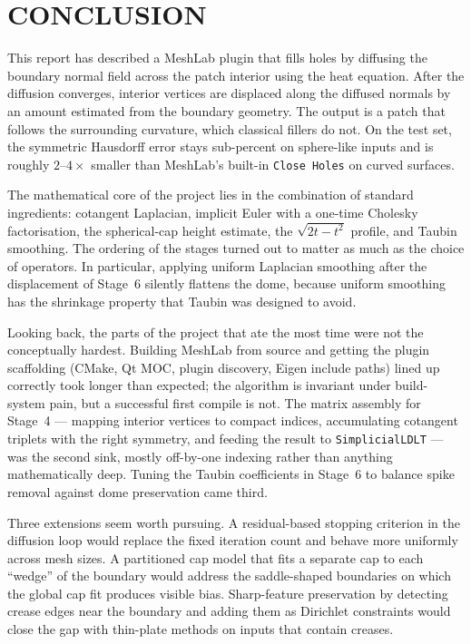 \chapter{CONCLUSION}

This report has described a MeshLab plugin that fills holes by diffusing the boundary normal field across the patch interior using the heat equation. After the diffusion converges, interior vertices are displaced along the diffused normals by an amount estimated from the boundary geometry. The output is a patch that follows the surrounding curvature, which classical fillers do not. On the test set, the symmetric Hausdorff error stays sub-percent on sphere-like inputs and is roughly $2$--$4\times$ smaller than MeshLab's built-in \texttt{Close Holes} on curved surfaces.

The mathematical core of the project lies in the combination of standard ingredients: cotangent Laplacian, implicit Euler with a one-time Cholesky factorisation, the spherical-cap height estimate, the $\sqrt{2t-t^2}$ profile, and Taubin smoothing. The ordering of the stages turned out to matter as much as the choice of operators. In particular, applying uniform Laplacian smoothing after the displacement of Stage~6 silently flattens the dome, because uniform smoothing has the shrinkage property that Taubin was designed to avoid.

Looking back, the parts of the project that ate the most time were not the conceptually hardest. Building MeshLab from source and getting the plugin scaffolding (CMake, Qt MOC, plugin discovery, Eigen include paths) lined up correctly took longer than expected; the algorithm is invariant under build-system pain, but a successful first compile is not. The matrix assembly for Stage~4 --- mapping interior vertices to compact indices, accumulating cotangent triplets with the right symmetry, and feeding the result to \texttt{SimplicialLDLT} --- was the second sink, mostly off-by-one indexing rather than anything mathematically deep. Tuning the Taubin coefficients in Stage~6 to balance spike removal against dome preservation came third.

Three extensions seem worth pursuing.
A residual-based stopping criterion in the diffusion loop would replace the fixed iteration count and behave more uniformly across mesh sizes.
A partitioned cap model that fits a separate cap to each ``wedge'' of the boundary would address the saddle-shaped boundaries on which the global cap fit produces visible bias.
Sharp-feature preservation by detecting crease edges near the boundary and adding them as Dirichlet constraints would close the gap with thin-plate methods on inputs that contain creases.

